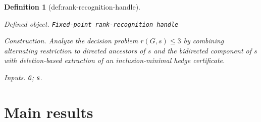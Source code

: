 \documentclass{article}
\newtheorem{definition}{Definition}
\begin{document}
\begin{definition}[def:rank-recognition-handle]\label{def:rank-recognition-handle}
\par\smallskip\noindent\emph{Defined object.} \texttt{Fixed-\allowbreak{}point rank-\allowbreak{}recognition handle}
\par\smallskip\noindent\emph{Construction.} Analyze the decision problem \(r(G,s)\leq3\) by combining alternating restriction to directed ancestors of \(s\) and the bidirected component of \(s\) with deletion-based extraction of an inclusion-minimal hedge certificate.
\par\smallskip\noindent\emph{Inputs.} \texttt{G}; \texttt{s}.
\end{definition}

\section{Main results}
\end{document}
